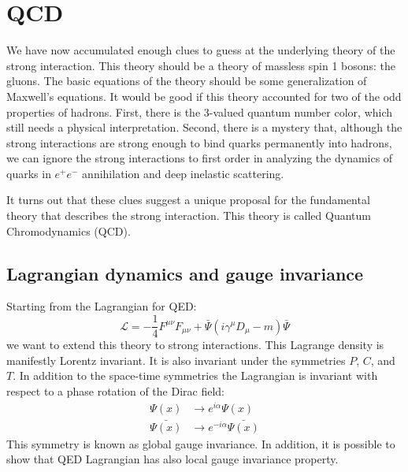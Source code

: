 \documentclass[../../main/main.tex]{subfiles}
\begin{document}

\section{QCD}
We have now accumulated enough clues to guess at the underlying theory of the strong interaction. This theory should be a theory of massless spin 1 bosons: the gluons. The basic equations of the theory should be some generalization of Maxwell’s equations. It would be good if this theory accounted for two of the odd properties of hadrons. First, there is the 3-valued quantum number color, which still needs a physical interpretation. Second, there is a mystery that, although the strong interactions are strong enough to bind quarks permanently into hadrons, we can ignore the strong interactions to first order in analyzing the dynamics of quarks in \( e^+e^- \) annihilation and deep inelastic scattering.

It turns out that these clues suggest a unique proposal for the fundamental theory that describes the strong interaction. This theory is called Quantum Chromodynamics (QCD).



\subsection{Lagrangian dynamics and gauge invariance}
Starting from the Lagrangian for QED:
\begin{equation}
	\mathcal{L}
	=
	- \frac{1}{4} F^{\mu\nu} F_{\mu\nu} + \bar{\Psi}(i\gamma^{\mu}D_{\mu} - m)\bar{\Psi}
	\label{eq:L11_QEDLD}
\end{equation}
we want to extend this theory to strong interactions. This Lagrange density is manifestly Lorentz invariant. It is also invariant under the symmetries \( P \), \( C \), and \( T \). In addition to the space-time symmetries the Lagrangian is invariant with respect to a phase rotation of the Dirac field:
\begin{align}
	\Psi(x) 		&\longrightarrow e^{i\alpha} \Psi(x)	\\
	\bar{\Psi(x)} 	&\longrightarrow e^{-i\alpha} \bar{\Psi(x)}
\end{align}
This symmetry is known as global gauge invariance. In addition, it is possible to show that QED Lagrangian has also local gauge invariance property.
\end{document}
